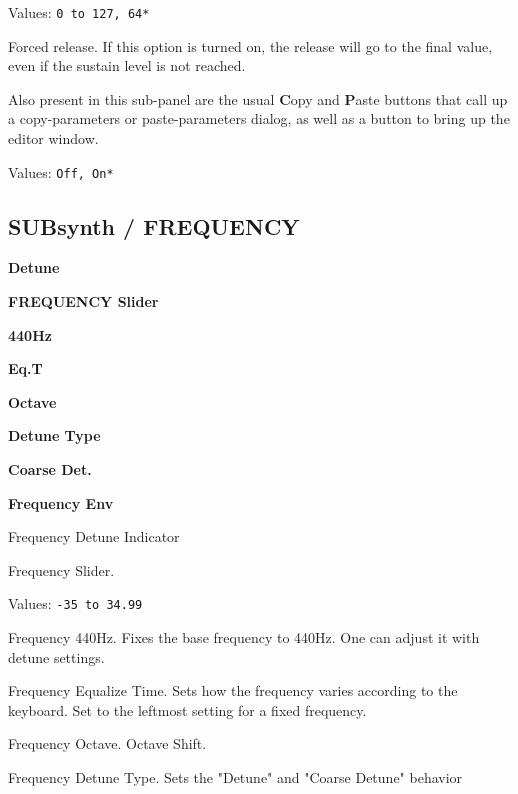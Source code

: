    Values: \texttt{0 to 127, 64*}

   Forced release.
   If this option is turned on, the release will go to the
   final value, even if the sustain level is not reached.

   Also present in this sub-panel are the usual \textbf{C}opy
   and \textbf{P}aste buttons that call up a copy-parameters or
   paste-parameters dialog, as well as a button
   to bring up the editor window.

   Values: \texttt{Off, On*}

\subsection{SUBsynth / FREQUENCY}
\label{subsec:subsynth_frequency}

   \begin{enumber}
      \item \textbf{Detune}
      \item \textbf{FREQUENCY Slider}
      \item \textbf{440Hz}
      \item \textbf{Eq.T}
      \item \textbf{Octave}
      \item \textbf{Detune Type}
      \item \textbf{Coarse Det.}
      \item \textbf{Frequency Env}
   \end{enumber}

   \setcounter{ItemCounter}{0}      %

   Frequency Detune Indicator

   Frequency Slider.

   Values: \texttt{-35 to 34.99}

   Frequency 440Hz.
   Fixes the base frequency to 440Hz.
   One can adjust it with detune settings.

   Frequency Equalize Time.
   Sets how the frequency varies according to the keyboard.
   Set to the leftmost setting for a fixed frequency.

   Frequency Octave.
   Octave Shift.

   Frequency Detune Type.
   Sets the "Detune" and "Coarse Detune" behavior 

